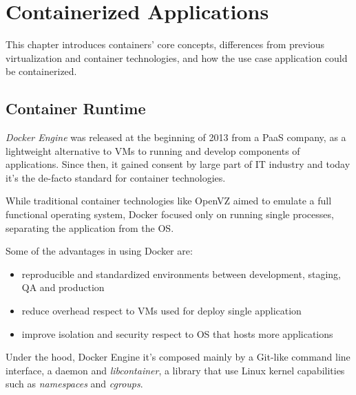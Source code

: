 \chapter{Containerized Applications}\label{containerized-applications}

This chapter introduces containers' core concepts, differences from
previous virtualization and container technologies, and how the use case
application could be containerized.

\section{Container Runtime}\label{container-runtime}

\emph{Docker Engine} was released at the beginning of 2013 from a PaaS
company, as a lightweight alternative to VMs to running and develop
components of applications. Since then, it gained consent by large part
of IT industry and today it's the de-facto standard for container
technologies.

While traditional container technologies like OpenVZ aimed to emulate a
full functional operating system, Docker focused only on running single
processes, separating the application from the OS.

Some of the advantages in using Docker are:

\begin{itemize}
\itemsep1pt\parskip0pt
\item
  reproducible and standardized environments between development,
  staging, QA and production
\item
  reduce overhead respect to VMs used for deploy single application
\item
  improve isolation and security respect to OS that hosts more
  applications
\end{itemize}

Under the hood, Docker Engine it's composed mainly by a Git-like command
line interface, a daemon and \emph{libcontainer}, a library that use
Linux kernel capabilities such as \emph{namespaces} and \emph{cgroups}.

